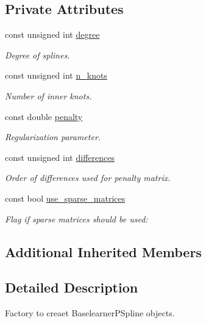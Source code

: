 \subsection*{Private Attributes}
\begin{DoxyCompactItemize}
\item 
const unsigned int \mbox{\hyperlink{classblearnerfactory_1_1_baselearner_p_spline_factory_aa245143409b64073ba36700c6868ece5}{degree}}
\begin{DoxyCompactList}\small\item\em Degree of splines. \end{DoxyCompactList}\item 
const unsigned int \mbox{\hyperlink{classblearnerfactory_1_1_baselearner_p_spline_factory_a11e98fcad44d686df7be69d3176480f9}{n\+\_\+knots}}
\begin{DoxyCompactList}\small\item\em Number of inner knots. \end{DoxyCompactList}\item 
const double \mbox{\hyperlink{classblearnerfactory_1_1_baselearner_p_spline_factory_a09f6c5d718ae1ded72a21c6d270c3d32}{penalty}}
\begin{DoxyCompactList}\small\item\em Regularization parameter. \end{DoxyCompactList}\item 
const unsigned int \mbox{\hyperlink{classblearnerfactory_1_1_baselearner_p_spline_factory_a78e6dd2e69dd3782ac4082c04bcccdff}{differences}}
\begin{DoxyCompactList}\small\item\em Order of differences used for penalty matrix. \end{DoxyCompactList}\item 
const bool \mbox{\hyperlink{classblearnerfactory_1_1_baselearner_p_spline_factory_ac0e83c55bc1d631663f639fea394e253}{use\+\_\+sparse\+\_\+matrices}}
\begin{DoxyCompactList}\small\item\em Flag if sparse matrices should be used\+: \end{DoxyCompactList}\end{DoxyCompactItemize}
\subsection*{Additional Inherited Members}


\subsection{Detailed Description}
Factory to creaet {\ttfamily Baselearner\+P\+Spline} objects. 

